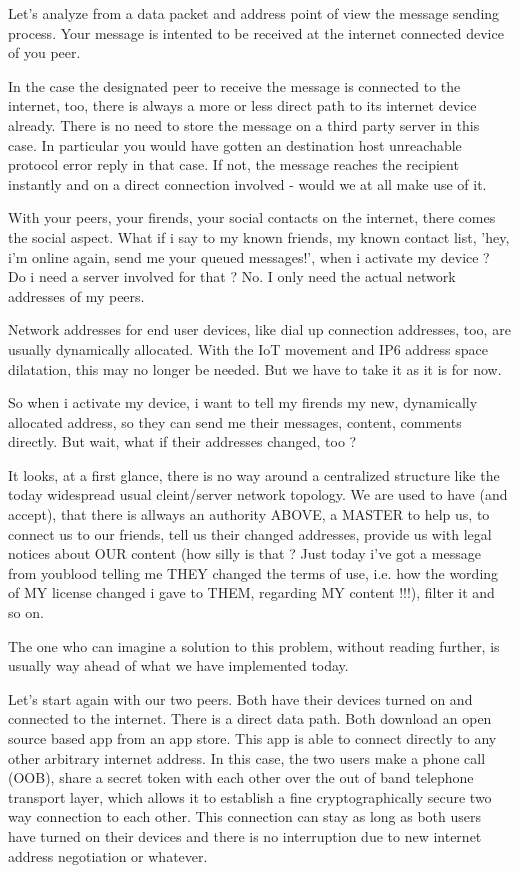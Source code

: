 Let's analyze from a data packet and address point of view the message
sending process. Your message is intented to be received at the
internet connected device of you peer.

In the case the designated peer to receive the message is connected to
the internet, too, there is always a more or less direct path to its
internet device already. There is no need to store the message on a
third party server in this case. In particular you would have gotten
an destination host unreachable protocol error reply in that case. If
not, the message reaches the recipient instantly and on a direct
connection involved - would we at all make use of it.

With your peers, your firends, your social contacts on the internet,
there comes the social aspect. What if i say to my known friends, my
known contact list, 'hey, i'm online again, send me your queued
messages!', when i activate my device ? Do i need a server involved
for that ? No. I only need the actual network addresses of my peers.

Network addresses for end user devices, like dial up connection
addresses, too, are usually dynamically allocated. With the IoT
movement and IP6 address space dilatation, this may no longer be
needed. But we have to take it as it is for now.

So when i activate my device, i want to tell my firends my new,
dynamically allocated address, so they can send me their messages,
content, comments directly. But wait, what if their addresses
changed, too ?

It looks, at a first glance, there is no way around a centralized
structure like the today widespread usual cleint/server network
topology. We are used to have (and accept), that there is allways an
authority ABOVE, a MASTER to help us, to connect us to our friends,
tell us their changed addresses, provide us with legal notices about
OUR content (how silly is that ? Just today i've got a message from
youblood telling me THEY changed the terms of use, i.e. how the
wording of MY license changed i gave to THEM, regarding MY content
!!!), filter it and so on.

The one who can imagine a solution to this problem, without reading
further, is usually way ahead of what we have implemented today.

Let's start again with our two peers. Both have their devices turned
on and connected to the internet. There is a direct data path. Both
download an open source based app from an app store. This app is able
to connect directly to any other arbitrary internet address. In this
case, the two users make a phone call (OOB), share a secret token with
each other over the out of band telephone transport layer, which
allows it to establish a fine cryptographically secure two way
connection to each other. This connection can stay as long as both
users have turned on their devices and there is no interruption due to
new internet address negotiation or whatever.

